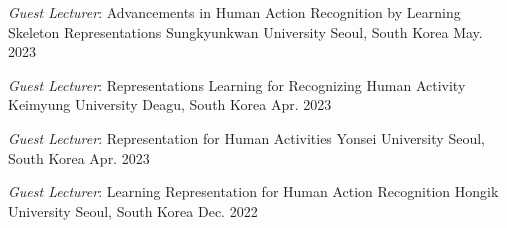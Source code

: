 \newpage

\vspace{.5em}

\cventry
{\textit{Guest Lecturer}: Advancements in Human Action Recognition by Learning Skeleton Representations}
{Sungkyunkwan University}
{Seoul, South Korea}
{May. 2023}
{}
\vspace{-1em}


\cventry
{\textit{Guest Lecturer}: Representations Learning for Recognizing Human Activity}
{Keimyung University}
{Deagu, South Korea}
{Apr. 2023}
{}


\vspace{-1em}
\cventry
{\textit{Guest Lecturer}: Representation for Human Activities}
{Yonsei University}
{Seoul, South Korea}
{Apr. 2023}
{}

\vspace{-1em}
\cventry
{\textit{Guest Lecturer}: Learning Representation for Human Action Recognition}
{Hongik University}
{Seoul, South Korea}
{Dec. 2022}
{}
\vspace{-1em}

